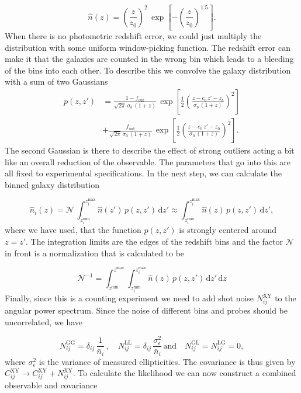 \documentclass[oneside]{book}
\newcommand*{\rd}{\mathrm{d}}
\begin{document}
 \begin{equation}
    \hat{n}(z) = \left(\frac{z}{z_0}\right)^2\,\exp\left[-\left(\frac{z}{z_0}\right)^{1.5}\right].
 \end{equation} 
 When there is no photometric redshift error, we could just multiply the distribution with some uniform window-picking function. The redshift error can make it that the galaxies are counted in the wrong bin which leads to a bleeding of the bins into each other. To describe this we convolve the galaxy distribution with a sum of two Gaussians
 \begin{align}
    p(z,z') &= \frac{1-f_\mathrm{out}}{\sqrt{2\pi}\,\sigma_b\,(1+z)}\,\exp\left[\frac{1}{2}\left(\frac{z-c_b\,z'-z_b}{\sigma_b\,(1+z)}\right)^2\right] \nonumber\\
    &+ \frac{f_\mathrm{out}}{\sqrt{2\pi}\,\sigma_0\,(1+z)}\,\exp\left[\frac{1}{2}\left(\frac{z-c_0\,z'-z_0}{\sigma_0\,(1+z)}\right)^2\right].
 \end{align}
 The second Gaussian is there to describe the effect of strong outliers acting a bit like an overall reduction of the observable. The parameters that go into this are all fixed to experimental specifications. In the next step, we can calculate the binned galaxy distribution 

 \begin{equation}
    \hat{n}_i(z) = \mathcal{N}\, \int_{z_i^\mathrm{min}}^{z_i^\mathrm{max}} \hat{n}(z')\, p(z,z')\,\rd z' \approx \int_{z_i^\mathrm{min}}^{z_i^\mathrm{max}} \hat{n}(z)\, p(z,z')\,\rd z' ,
 \end{equation}
 where we have used, that the function $p(z,z')$ is strongly centered around $z=z'$. The integration limits are the edges of the redshift bins and the factor $\mathcal{N}$ in front is a normalization that is calculated to be  
 
 \begin{equation}
    \mathcal{N}^{-1} = \int_{z^\mathrm{min}}^{z^\mathrm{max}} \int_{z_i^\mathrm{min}}^{z_i^\mathrm{max}} \hat{n}(z)\, p(z,z')\,\rd z'\,\rd z
 \end{equation}
 Finally, since this is a counting experiment we need to add shot noise $N^\mathrm{XY}_{ij}$ to the angular power spectrum. Since the noise of different bins and probes should be uncorrelated, we have

 \begin{equation}
    N^\mathrm{GG}_{ij} = \delta_{ij}\,\frac{1}{\bar{n}_i}\, ,\quad N^\mathrm{LL}_{ij} = \delta_{ij}\,\frac{\sigma^2_\epsilon}{\bar{n}_i}\,\text{and}\quad N^\mathrm{GL}_{ij} = N^\mathrm{LG}_{ij} = 0,
 \end{equation}
 where $\sigma^2_\epsilon$ is the variance of measured ellipticities. The covariance is thus given by $C^\mathrm{XY}_{ij} \to C^\mathrm{XY}_{ij}+N^\mathrm{XY}_{ij}$.
 To calculate the likelihood we can now construct a combined observable and covariance 
 
\end{document}
